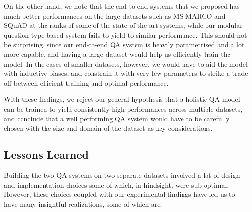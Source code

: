 On the other hand, we note that the end-to-end systems that we proposed has much better performances on the large datasets such as MS MARCO and SQuAD at the ranks of some of the state-of-the-art systems, while our modular question-type based system fails to yield to similar performance. This should not be surprising, since our end-to-end QA system is heavily parametrized and a lot more capable, and having a large dataset would help us efficiently train the model. In the cases of smaller datasets, however, we would have to aid the model with inductive biases, and constrain it with very few parameters to strike a trade off between efficient training and optimal performance. 

With these findings, we reject our general hypothesis that a holistic QA model can be trained to yield consistently high performances across multiple datasets, and conclude that a well performing QA system would have to be carefully chosen with the size and domain of the dataset as key considerations.

\subsection{Lessons Learned}

Building the two QA systems on two separate datasets involved a lot of design and implementation choices some of which, in hindsight, were sub-optimal. However, these choices coupled with our experimental findings have led us to have many insightful realizations, some of which are:

